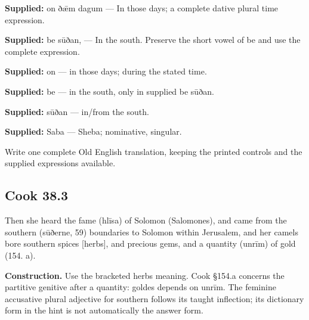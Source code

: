 \textbf{Supplied:} on ðǣm dagum — In those days; a complete dative plural time expression.

\textbf{Supplied:} be sūðan, — In the south. Preserve the short vowel of be and use the complete expression.

\textbf{Supplied:} on — in those days; during the stated time.

\textbf{Supplied:} be — in the south, only in supplied be sūðan.

\textbf{Supplied:} sūðan — in/\allowbreak{}from the south.

\textbf{Supplied:} Saba — Sheba; nominative, singular.

Write one complete Old English translation, keeping the printed controls and the supplied expressions available.

\par\begin{minipage}{\linewidth}\raggedright
\subsection*{Cook 38.3}

Then she heard the fame (hlīsa) of Solomon (Salomones), and came from the southern (sūðerne, 59) boundaries to Solomon within Jerusalem, and her camels bore southern spices [herbs], and precious gems, and a quantity (unrīm) of gold (154. a).

\end{minipage}\par\addvspace{4pt}

\textbf{Construction.} Use the bracketed herbs meaning. Cook §154.a concerns the partitive genitive after a quantity: goldes depends on unrīm. The feminine accusative plural adjective for southern follows its taught inflection; its dictionary form in the hint is not automatically the answer form.

